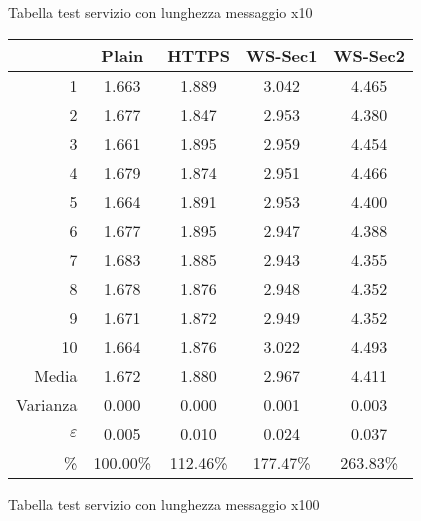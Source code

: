 Tabella test servizio con lunghezza messaggio x10\\

\begin{small}\begin{longtable}{|r|c|c|c|c|}
\hline\hline
&Plain&HTTPS&WS-Sec1&WS-Sec2\\
\hline\hline
1&1.663&1.889&3.042&4.465\\
\hline
2&1.677&1.847&2.953&4.380\\
\hline
3&1.661&1.895&2.959&4.454\\
\hline
4&1.679&1.874&2.951&4.466\\
\hline
5&1.664&1.891&2.953&4.400\\
\hline
6&1.677&1.895&2.947&4.388\\
\hline
7&1.683&1.885&2.943&4.355\\
\hline
8&1.678&1.876&2.948&4.352\\
\hline
9&1.671&1.872&2.949&4.352\\
\hline
10&1.664&1.876&3.022&4.493\\
\hline\hline
Media&1.672&1.880&2.967&4.411\\
\hline
Varianza&0.000&0.000&0.001&0.003\\
\hline
$\varepsilon$&0.005&0.010&0.024&0.037\\
\hline
\%&100.00\%&112.46\%&177.47\%&263.83\%\\
\hline\hline
\end{longtable}\end{small}

Tabella test servizio con lunghezza messaggio x100\\

